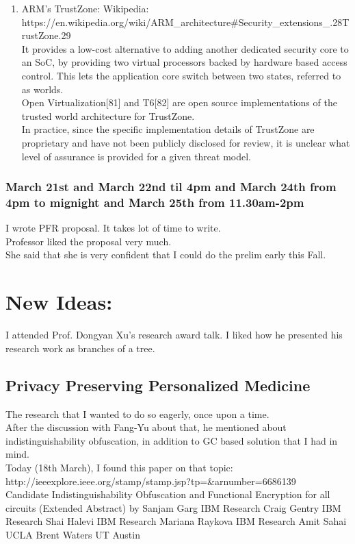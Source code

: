 \documentclass[11pt]{article}
\begin{document}
\begin{enumerate}
\item ARM's TrustZone: Wikipedia: https://en.wikipedia.org/wiki/ARM\_architecture\#Security\_extensions\_.28TrustZone.29\\
It provides a low-cost alternative to adding another dedicated security core to an SoC, by providing two virtual processors backed by hardware based 
access control. This lets the application core switch between two states, referred to as worlds.\\
Open Virtualization[81] and T6[82] are open source implementations of the trusted world architecture for TrustZone.\\
In practice, since the specific implementation details of TrustZone are proprietary and have not been publicly disclosed for review, it is unclear 
what level of assurance is provided for a given threat model.

\end{enumerate}

\subsubsection*{March 21st and March 22nd til 4pm and March 24th from 4pm to mignight and March 25th from 11.30am-2pm}
I wrote PFR proposal. It takes lot of time to write.\\

Professor liked the proposal very much.\\

She said that she is very confident that I could do the prelim early this Fall.

\pagebreak

\section*{New Ideas:}

I attended Prof. Dongyan Xu's research award talk. I liked how he presented his research work as branches of a tree.

\subsection{Privacy Preserving Personalized Medicine}
The research that I wanted to do so eagerly, once upon a time. \\
After the discussion with Fang-Yu about that, he mentioned about indistinguishability obfuscation, in addition to GC based solution that I had in 
mind.\\
Today (18th March), I found this paper on that topic: http://ieeexplore.ieee.org/stamp/stamp.jsp?tp=\&arnumber=6686139\\
Candidate Indistinguishability Obfuscation and Functional Encryption for all circuits
(Extended Abstract) by Sanjam Garg IBM Research Craig Gentry IBM Research Shai Halevi IBM Research Mariana Raykova IBM Research Amit Sahai UCLA Brent 
Waters UT Austin
\end{document}
